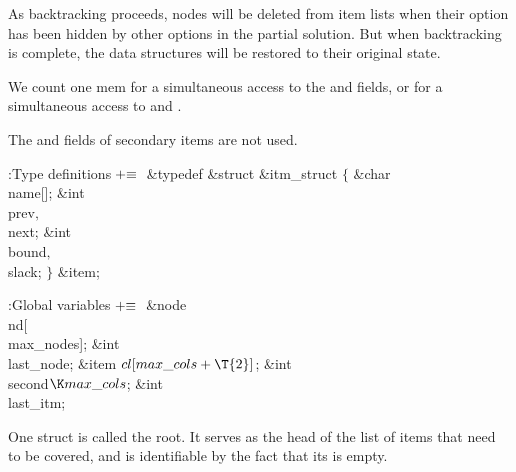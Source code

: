As backtracking proceeds, nodes
will be deleted from item lists when their option has been hidden by
other options in the partial solution.
But when backtracking is complete, the data structures will be
restored to their original state.

We count one mem for a simultaneous access to the  and  fields,
or for a simultaneous access to  and .

The  and  fields of secondary items are not used.

\Y\B\4:Type definitions\X${}\mathrel+\equiv{}$\6
\&{typedef} \&{struct} \&{itm\_struct} ${}\{{}$\1\6
\&{char} \\{name}[];\6
\&{int} \\{prev}${},{}$ \\{next};\6
\&{int} \\{bound}${},{}$ \\{slack};\2\6
${}\}{}$ \&{item};\par
\fi

\B{}:Global variables\X${}\mathrel+\equiv{}$\6
\&{node} \\{nd}[\\{max\_nodes}];\6
\&{int} \\{last\_node};\6
\&{item} ${}\\{cl}[\\{max\_cols}+\T{2}]{}$;\6
\&{int} \\{second}${}\K\\{max\_cols}{}$;\6
\&{int} \\{last\_itm};%
\par
\fi

One  struct is called the root. It serves as the head of the
list of items that need to be covered, and is identifiable by the fact
that its  is empty.

